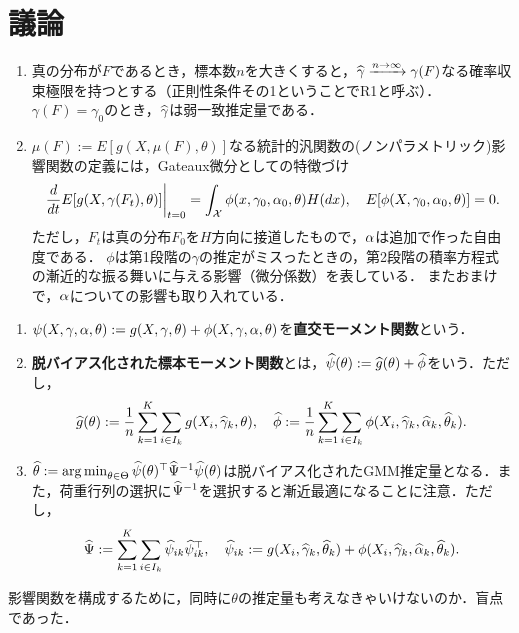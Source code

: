 \documentclass[uplatex,dvipdfmx]{jsreport}
\begin{document}
\section{議論}

\begin{notation}\mbox{}
    \begin{enumerate}
        \item 真の分布が$F$であるとき，標本数$n$を大きくすると，$\widehat{\gamma}\xrightarrow{n\to\infty}\gamma(F)$なる確率収束極限を持つとする（正則性条件その1ということでR1と呼ぶ）．$\gamma(F)=\gamma_0$のとき，$\widehat{\gamma}$は弱一致推定量である．
        \item $\mu(F):=E[g(X,\mu(F),\theta)]$なる統計的汎関数の(ノンパラメトリック)影響関数の定義には，Gateaux微分としての特徴づけ
        \[\left.\frac{d }{d t}E[g(X,\gamma(F_t),\theta)]\right|_{t=0}=\int_{\mathcal{X}}\phi(x,\gamma_0,\alpha_0,\theta)H(dx),\quad E[\phi(X,\gamma_0,\alpha_0,\theta)]=0.\]
        ただし，$F_t$は真の分布$F_0$を$H$方向に接道したもので，$\alpha$は追加で作った自由度である．
        $\phi$は第1段階の$\gamma$の推定がミスったときの，第2段階の積率方程式の漸近的な振る舞いに与える影響（微分係数）を表している．
        またおまけで，$\alpha$についての影響も取り入れている．
    \end{enumerate}
\end{notation}

\begin{definition}\mbox{}
    \begin{enumerate}
        \item $\psi(X,\gamma,\alpha,\theta):=g(X,\gamma,\theta)+\phi(X,\gamma,\alpha,\theta)$を\textbf{直交モーメント関数}という．
        \item \textbf{脱バイアス化された標本モーメント関数}とは，$\widehat{\psi}(\theta):=\widehat{g}(\theta)+\widehat{\phi}$をいう．ただし，
        \[\widehat{g}(\theta):=\frac{1}{n}\sum_{k=1}^K\sum_{i\in I_k}g(X_i,\widehat{\gamma}_k,\theta),\quad\widehat{\phi}:=\frac{1}{n}\sum_{k=1}^K\sum_{i\in I_k}\phi(X_i,\widehat{\gamma}_k,\widehat{\alpha}_k,\widehat{\theta}_k).\]
        \item $\widehat{\theta}:=\operatorname*{arg\,min}_{\theta\in\Theta}\widehat{\psi}(\theta)^\top\widehat{\Psi}^{-1}\widehat{\psi}(\theta)$は脱バイアス化されたGMM推定量となる．また，荷重行列の選択に$\widehat{\Psi}^{-1}$を選択すると漸近最適になることに注意．ただし，
        \[\widehat{\Psi}:=\sum_{k=1}^K\sum_{i\in I_k}\widehat{\psi}_{ik}\widehat{\psi}_{ik}^\top,\quad \widehat{\psi}_{ik}:=g(X_i,\widehat{\gamma}_k,\widehat{\theta}_k)+\phi(X_i,\widehat{\gamma}_k,\widehat{\alpha}_k,\widehat{\theta}_k).\]
    \end{enumerate}
\end{definition}
\begin{remark}
    影響関数を構成するために，同時に$\theta$の推定量も考えなきゃいけないのか．盲点であった．
\end{remark}
\end{document}
